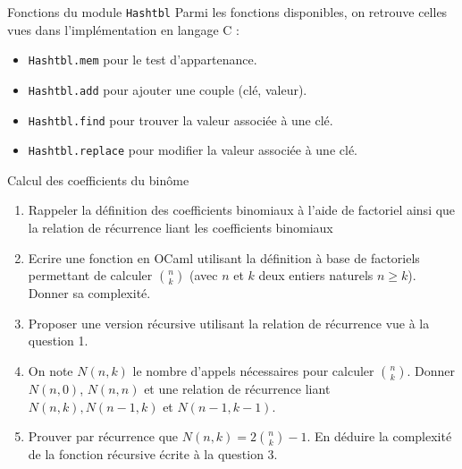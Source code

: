 \documentclass[10pt]{beamer}
\begin{document}
\begin{frame}{\Ctitle}{\stitle}
	\begin{block}{Fonctions du module {\tt Hashtbl}}
		Parmi les fonctions disponibles, on retrouve celles vues dans l'implémentation en langage C :
		\begin{itemize}
			\item<2-> \texttt{Hashtbl.mem} pour le test d'appartenance.
			\item<3-> \texttt{Hashtbl.add} pour ajouter une couple (clé, valeur).
			\item<4-> \texttt{Hashtbl.find} pour trouver la valeur associée à une clé.
			\item<5-> \texttt{Hashtbl.replace} pour modifier la valeur associée à une clé.
		\end{itemize}
	\end{block}
\end{frame}

\begin{frame}{\Ctitle}{\stitle}
	\begin{block}{Calcul des coefficients du binôme}
		\begin{enumerate}
			\item<1-> Rappeler la définition des coefficients binomiaux à l'aide de factoriel ainsi que la relation de récurrence liant les coefficients binomiaux
			\item<2-> Ecrire une fonction en OCaml utilisant la définition à base de factoriels permettant de calculer $\binom{n}{k}$ (avec $n$ et $k$ deux entiers naturels $n\geq k$). Donner sa complexité.
			\item<3-> Proposer une version récursive utilisant la relation de récurrence vue à la question 1.
			\item<4-> On note $N(n,k)$ le nombre d'appels  nécessaires pour calculer $\binom{n}{k}$. Donner $N(n,0)$, $N(n,n)$ et une relation de récurrence liant $N(n,k), N(n-1,k)$ et $N(n-1,k-1)$.
			\item<5-> Prouver par récurrence que $N(n,k) = 2\binom{n}{k} -1$. En déduire la complexité de la fonction récursive écrite à la question 3.
		\end{enumerate}
	\end{block}
\end{frame}
\end{document}
